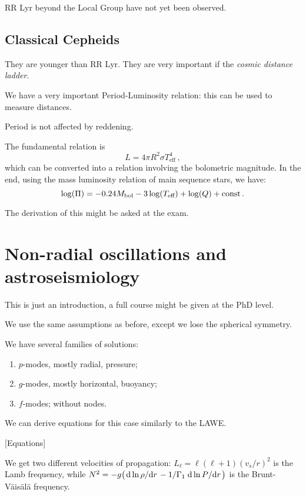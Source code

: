 \documentclass[main.tex]{subfiles}
\begin{document}
RR Lyr beyond the Local Group have not
yet been observed.

\subsection{Classical Cepheids}

They are younger than RR Lyr.
They are very important if the \emph{cosmic distance ladder}.

We have a very important Period-Luminosity relation: this can be used to measure distances.

Period is not affected by reddening.

The fundamental relation is 
%
\begin{equation}
  L = 4 \pi R^2 \sigma T^4 _{\text{eff}}
\,,
\end{equation}
%
which can be converted into a relation involving the bolometric magnitude.
In the end,  using the mass luminosity relation of main sequence stars, we have: 
%
\begin{equation}
  \log(\Pi ) = \num{-0.24}M _{\text{bol}} - 3 \log(T _{\text{eff}}) + \log(Q) + \text{const}
\,.
\end{equation}
%

The derivation of this might be asked at the exam.

\section{Non-radial oscillations and astroseismiology}

This is just an introduction, a full course might be given at the PhD level.

We use the same assumptions as before, except we lose the spherical symmetry.

We have several families of solutions: 

\begin{enumerate}
    \item \(p\)-modes, mostly radial, pressure;
    \item \(g\)-modes, mostly horizontal, buoyancy;
    \item \(f\)-modes; without nodes.
\end{enumerate}

We can derive equations for this case similarly to the LAWE.

[Equations]

We get two different velocities of propagation: \(L_{\ell} = \ell (\ell + 1) (v_s / r)^2\) is the Lamb frequency, while \(N^2= -g \qty(\dv*{\ln \rho }{r} - 1/\Gamma_1 \dv*{\ln P }{r} )\) is the Brunt-Väisälä frequency.
\end{document}
